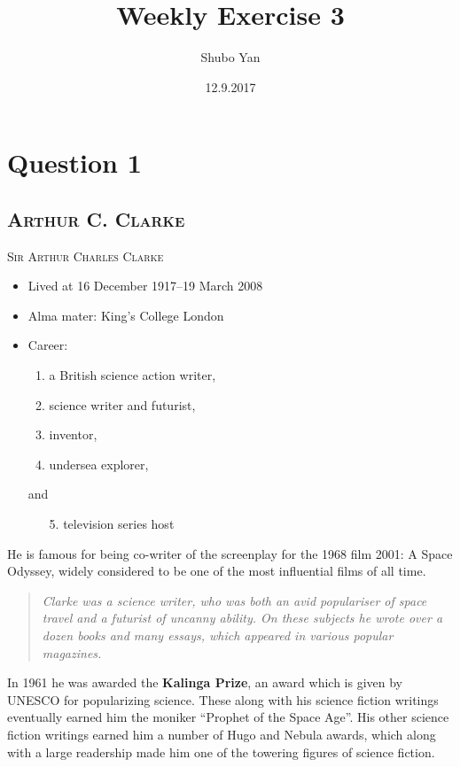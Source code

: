 \documentclass[a4paper,12pt]{article}
\title{ Weekly Exercise 3}
\author{Shubo Yan }
\date{12.9.2017}
\begin{document}
	\maketitle
\newpage
\section{Question 1}
\subsection*{\textsc{Arthur C. Clarke}}

{\LARGE \textsc {Sir Arthur Charles Clarke}\par}

\begin{itemize}	
\item Lived at 16 December 1917--19 March 2008
\item Alma mater: King's College London
\item Career:
\begin{enumerate}
\item a British science  action writer,
\item science writer and futurist,
\item inventor,
\item undersea explorer,
\end{enumerate}	
and
\begin{enumerate}
\item[5.] television series host
\end{enumerate}	
\end{itemize}	

He is famous for being co-writer of the screenplay for the 1968 film 2001: A Space Odyssey, widely considered to be one of the most influential films of all time.
\begin{quote}
\emph{Clarke was a science writer, who was both an avid populariser of space travel and a futurist of uncanny ability. On these subjects he wrote over a dozen books and many essays, which appeared in various popular magazines.}
\end{quote}
In 1961 he was awarded the \textbf{Kalinga Prize}, an award which is given by UNESCO for popularizing science. These along with his science fiction writings eventually earned him the moniker ``Prophet of the Space Age''. His other science fiction writings earned him a number of Hugo and Nebula awards, which along with a large readership made him one of the towering figures of science fiction.
\end{document}

